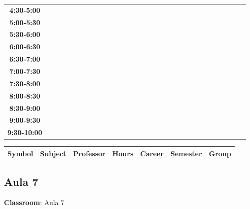 \documentclass{article}
\begin{document}
\begin{table}[ht]
\begin{tabular}{|c|c|c|c|c|c|c|c|c|c|c|c|c|c|c|c|c|c|c|c|c|c|c|c|c|c|c|c|c|c|}
 \cline{1-8} 
\textbf{4:30-5:00} &   &   &   &   &   &   &   \\
 \cline{1-8} 
\textbf{5:00-5:30} &   &   &   &   &   &   &   \\
 \cline{1-8} 
\textbf{5:30-6:00} &   &   &   &   &   &   &   \\
 \cline{1-8} 
\textbf{6:00-6:30} &   &   &   &   &   &   &   \\
 \cline{1-8} 
\textbf{6:30-7:00} &   &   &   &   &   &   &   \\
 \cline{1-8} 
\textbf{7:00-7:30} &   &   &   &   &   &   &   \\
 \cline{1-8} 
\textbf{7:30-8:00} &   &   &   &   &   &   &   \\
 \cline{1-8} 
\textbf{8:00-8:30} &   &   &   &   &   &   &   \\
 \cline{1-8} 
\textbf{8:30-9:00} &   &   &   &   &   &   &   \\
 \cline{1-8} 
\textbf{9:00-9:30} &   &   &   &   &   &   &   \\
 \cline{1-8} 
\textbf{9:30-10:00} &   &   &   &   &   &   &   \\
 \cline{1-8} 
\end{tabular}\end{table}

        
        \begin{tabular}{|>{\centering\arraybackslash}m{2cm}|>{\centering\arraybackslash}m{4cm}|>{\centering\arraybackslash}m{2.15cm}|>{\centering\arraybackslash}m{1.8cm}|>{\centering\arraybackslash}m{2cm}|>{\centering\arraybackslash}m{2cm}|>{\centering\arraybackslash}m{2cm}|}
        \hline
        \textbf{Symbol} & \textbf{Subject} & \textbf{Professor} & \textbf{Hours} & \textbf{Career} & \textbf{Semester} & \textbf{Group} \\
        \hline
        \end{tabular}
                    

        \newpage
        

        \subsection{Aula 7}
        \vspace*{.1cm}
        
        \begin{flushright}
            {\LARGE \textbf{Classroom}: Aula 7}
        \end{flushright}
        \vspace{1cm}
\end{document}
